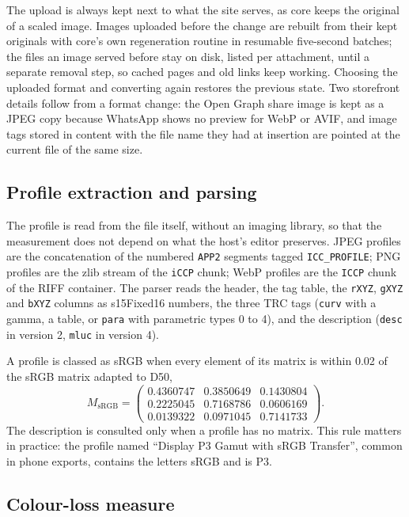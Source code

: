 \documentclass[sigconf,nonacm,screen]{acmart}
\begin{document}
The upload is always kept next to what the site serves, as core keeps the original of a scaled image. Images uploaded before the change are rebuilt from their kept originals with core's own regeneration routine in resumable five-second batches; the files an image served before stay on disk, listed per attachment, until a separate removal step, so cached pages and old links keep working. Choosing the uploaded format and converting again restores the previous state. Two storefront details follow from a format change: the Open Graph share image is kept as a JPEG copy because WhatsApp shows no preview for WebP or AVIF, and image tags stored in content with the file name they had at insertion are pointed at the current file of the same size.

\subsection{Profile extraction and parsing}
\label{sec:profilemethod}

The profile is read from the file itself, without an imaging library, so that the measurement does not depend on what the host's editor preserves. JPEG profiles are the concatenation of the numbered \texttt{APP2} segments tagged \texttt{ICC\_PROFILE}; PNG profiles are the zlib stream of the \texttt{iCCP} chunk; WebP profiles are the \texttt{ICCP} chunk of the RIFF container. The parser reads the header, the tag table, the \texttt{rXYZ}, \texttt{gXYZ} and \texttt{bXYZ} columns as s15Fixed16 numbers, the three TRC tags (\texttt{curv} with a gamma, a table, or \texttt{para} with parametric types 0 to 4), and the description (\texttt{desc} in version 2, \texttt{mluc} in version 4).

A profile is classed as sRGB when every element of its matrix is within 0.02 of the sRGB matrix adapted to D50,
\begin{equation}
M_{\mathrm{sRGB}} =
\begin{pmatrix}
0.4360747 & 0.3850649 & 0.1430804\\
0.2225045 & 0.7168786 & 0.0606169\\
0.0139322 & 0.0971045 & 0.7141733
\end{pmatrix}.
\end{equation}
The description is consulted only when a profile has no matrix. This rule matters in practice: the profile named ``Display P3 Gamut with sRGB Transfer'', common in phone exports, contains the letters sRGB and is P3.

\subsection{Colour-loss measure}
\label{sec:colourmethod}
\end{document}

